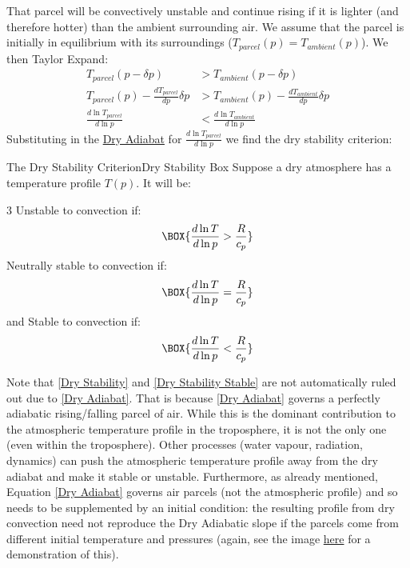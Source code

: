 That parcel will be convectively unstable and continue rising if it is lighter (and therefore hotter) than the ambient surrounding air. We assume that the parcel is initially in equilibrium with its surroundings (\(T_{parcel}(p)=T_{ambient}(p)\)). We then Taylor Expand:
\begin{align*}
    T_{parcel}(p-\delta p)&>T_{ambient}(p-\delta p)\\
    {T_{parcel}(p)}-\frac{d T_{parcel}}{d p}\delta p & >T_{ambient}(p)-\frac{d T_{ambient}}{d p}\delta p\\
    \frac{d \ln T_{parcel}}{d \ln p} & <\frac{d \ln T_{ambient}}{d \ln p}
\end{align*}
Substituting in the \hyperref[Dry Adiabat]{Dry Adiabat} for \(\frac{d \ln T_{parcel}}{d \ln p}\) we find the dry stability criterion:
\begin{fact}{The Dry Stability Criterion}{Dry Stability Box}\label{Dry Stability Box}
Suppose a dry atmosphere has a temperature profile \(T(p)\). It will be:
\begin{multicols}{3}
    \centering
    Unstable to convection if:\newline
    \begin{align}\label{Dry Stability}
        \BOX{\frac{d\ln T}{d\ln p}>\frac{R}{c_p}}
    \end{align}
    Neutrally stable to convection if:
    \begin{align}
        \BOX{\frac{d\ln T}{d\ln p}=\frac{R}{c_p}}
    \end{align}
    and Stable to convection if:
    \begin{align}\label{Dry Stability Stable}
        \BOX{\frac{d\ln T}{d\ln p}<\frac{R}{c_p}}
    \end{align}
\end{multicols}
\end{fact}
Note that \ref{Dry Stability} and \ref{Dry Stability Stable} are not automatically ruled out due to \ref{Dry Adiabat}. That is because \ref{Dry Adiabat} governs a perfectly adiabatic rising/falling parcel of air. While this is the dominant contribution to the atmospheric temperature profile in the troposphere,  it is not the only one (even within the troposphere). Other processes (water vapour, radiation, dynamics) can push the atmospheric temperature profile away from the dry adiabat and make it stable or unstable. Furthermore, as already mentioned, Equation \ref{Dry Adiabat} governs air parcels (not the atmospheric profile) and so needs to be supplemented by an initial condition: the resulting profile from dry convection need not reproduce the Dry Adiabatic slope if the parcels come from different initial temperature and pressures (again, see the image \href{https://en.wikipedia.org/wiki/Inversion_(meteorology)#/media/File:Absinkinversion.png}{here} for a demonstration of this). 

